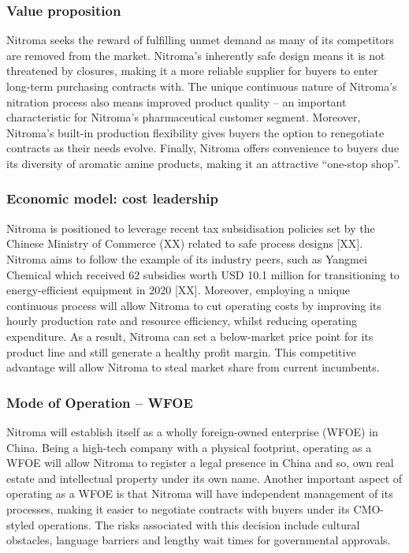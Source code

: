 \subsubsection{Value proposition}
Nitroma seeks the reward of fulfilling unmet demand as many of its competitors are removed from the market. Nitroma’s inherently safe design means it is not threatened by closures, making it a more reliable supplier for buyers to enter long-term purchasing contracts with. The unique continuous nature of Nitroma’s nitration process also means improved product quality – an important characteristic for Nitroma’s pharmaceutical customer segment. Moreover, Nitroma’s built-in production flexibility gives buyers the option to renegotiate contracts as their needs evolve. Finally, Nitroma offers convenience to buyers due its diversity of aromatic amine products, making it an attractive “one-stop shop”.
\subsubsection{Economic model: cost leadership}
Nitroma is positioned to leverage recent tax subsidisation policies set by the Chinese Ministry of Commerce (XX) related to safe process designs [XX]. Nitroma aims to follow the example of its industry peers, such as Yangmei Chemical which received 62 subsidies worth USD 10.1 million for transitioning to energy-efficient equipment in 2020 [XX]. Moreover, employing a unique continuous process will allow Nitroma to cut operating costs by improving its hourly production rate and resource efficiency, whilst reducing operating expenditure. As a result, Nitroma can set a below-market price point for its product line and still generate a healthy profit margin. This competitive advantage will allow Nitroma to steal market share from current incumbents. 
\subsubsection{Mode of Operation – WFOE}
Nitroma will establish itself as a wholly foreign-owned enterprise (WFOE) in China. Being a high-tech company with a physical footprint, operating as a WFOE will allow Nitroma to register a legal presence in China and so, own real estate and intellectual property under its own name. Another important aspect of operating as a WFOE is that Nitroma will have independent management of its processes, making it easier to negotiate contracts with buyers under its CMO-styled operations. The risks associated with this decision include cultural obstacles, language barriers and lengthy wait times for governmental approvals.

